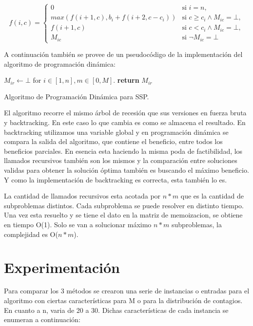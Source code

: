 \documentclass[10pt,a4paper]{article}
\begin{document}
\begin{equation} \label{eq:dp}
    f(i, c) = \begin{cases}
        0 & \text{si } i =n ,\\
        max(f(i+1,c),b_i+f(i+2,c-c_i)) & \text{si } c\geq c_i \land M_{ic}=\bot ,\\
        f(i+1,c) & \text{si } c < c_i \land M_{ic}=\bot ,\\
        M_{ic} & \text{si } \neg M_{ic}=\bot
    \end{cases}
\end{equation}

A continuación también se provee de un pseudocódigo de la implementación del algoritmo de programación dinámica:

\begin{algorithm}
\begin{algorithmic}[1]
\State $M_{ir} \gets \bot$ for $i \in [1, n], m \in [0, M]$.
    \EndIf
    \State \textbf{return} $M_{ir}$
\EndFunction
\end{algorithmic}
\caption{Algoritmo de Programación Dinámica para SSP.}
\label{alg:dp}
\end{algorithm}

El algoritmo recorre el mismo árbol de recesión que sus versiones en fuerza bruta y backtracking. En este caso lo que cambia es como se almacena el resultado. En backtracking utilizamos una variable global y en programación dinámica se compara la salida del algoritmo, que contiene el beneficio, entre todos los beneficios parciales. En esencia esta haciendo la misma poda de factibilidad, los llamados recursivos también son los mismos y la comparación entre soluciones validas para obtener la solución óptima también es buscando el máximo beneficio. Y como la implementación de backtracking es correcta, esta también lo es.

La cantidad de llamados recursivos esta acotada por $n*m$ que es la cantidad de subproblemas distintos. Cada subproblema se puede resolver en distinto tiempo. Una vez esta resuelto y se tiene el dato en la matriz de memoizacion, se obtiene en tiempo O(1). Solo se van a solucionar máximo $n*m$ subproblemas, la complejidad es O($n*m$).

\section{Experimentación} \label{sec:experimentacion}
Para comparar los 3 métodos se crearon una serie de instancias o entradas para el algoritmo con ciertas características para M o para la distribución de  contagios. En cuanto a n, varia de 20 a 30. Dichas características de cada instancia se enumeran a continuación:
\end{document}
